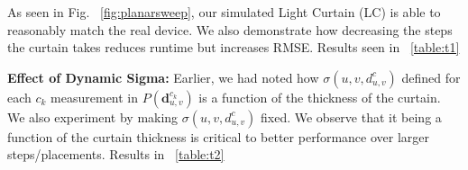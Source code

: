As seen in Fig. ~\ref{fig:planarsweep}, our simulated Light Curtain (LC) is able to reasonably match the real device. We also demonstrate how decreasing the steps the curtain takes reduces runtime but increases RMSE. Results seen in ~\ref{table:t1}

\noindent
\begin{table}[h]
   \centering
   \caption{Error wrt to time and number of Sweep steps}
   \label{table:t1}
\end{table}

\textbf{Effect of Dynamic Sigma:} Earlier, we had noted how $\sigma(u,v,d_{u,v}^{c})$ defined for each $c_{k}$ measurement in $P\left(\mathbf{d}_{u,v}^{c_{k}}\right)$ is a function of the thickness of the curtain. We also experiment by making $\sigma(u,v,d_{u,v}^{c})$ fixed. We observe that it being a function of the curtain thickness is critical to better performance over larger steps/placements. Results in ~\ref{table:t2}

\noindent
\begin{table}[h]
   \centering
   \caption{$\sigma_{c}$ in generated $P\left(\mathbf{d}_{u,v}^{c_{k}}\right)$ being fixed vs being dynamic as a function of curtain thickness with real LC}
   \label{table:t2}
\end{table}

